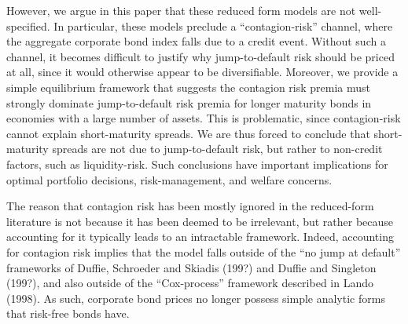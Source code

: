\documentclass[titlepage,11pt]{article}
\begin{document}
However, we argue in this paper that these reduced form models
are not well-specified.  In particular, these models preclude
a ``contagion-risk'' channel, where the aggregate corporate
bond index falls due to a credit event.  Without such a channel, it
becomes difficult to justify why jump-to-default risk should be priced at all, since
it would otherwise appear to be diversifiable.  Moreover, we provide a simple equilibrium
framework that suggests the contagion risk premia must strongly dominate jump-to-default risk premia
for longer maturity bonds in economies with a large number of assets.  This is problematic,
since contagion-risk cannot explain short-maturity
spreads.  We are thus forced to conclude that short-maturity spreads are not due to jump-to-default risk,
but rather to non-credit factors, such as liquidity-risk.  Such conclusions have important
implications for optimal portfolio decisions, risk-management, and welfare concerns.



The reason that contagion risk has been mostly ignored in the reduced-form literature is not because
it has been deemed to be irrelevant, but rather because
accounting for it typically leads to an intractable framework.  Indeed, accounting for contagion
risk implies that the model falls outside of the ``no jump at default'' frameworks of Duffie,
Schroeder and Skiadis (199?) and Duffie and Singleton (199?), and also outside of the ``Cox-process''
framework described in Lando (1998).  As such, corporate bond prices no longer possess
simple analytic forms that risk-free bonds have.
\end{document}
